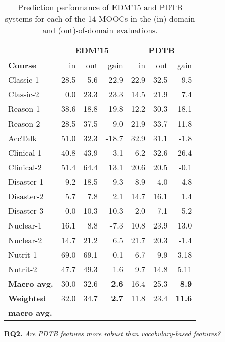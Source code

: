 \documentclass[letterpaper]{article}
\begin{document}
\begin{table}
\centering
\def\arraystretch{1.15}%
\small
\begin{tabular}{|l|r|r|r||r|r|r|}
\hline 
&
\multicolumn{3}{c||}{EDM'15} & 
\multicolumn{3}{c|}{PDTB}
\\
\hline
\bf Course&  in&  out & gain & in& out & gain\\
\hline
{\sc Classic-1} & 28.5& 5.6& -22.9& 22.9& 32.5& 9.5\\
\hline
{\sc Classic-2} & 0.0& 23.3& 23.3& 14.5& 21.9& 7.4\\
\hline
{\sc Reason-1} & 38.6& 18.8& -19.8& 12.2& 30.3& 18.1\\
\hline
{\sc Reason-2} & 28.5& 37.5& 9.0& 21.9& 33.7& 11.8\\
\hline
\hline
{\sc AccTalk} & 51.0& 32.3& -18.7& 32.9& 31.1& -1.8\\
\hline
{\sc Clinical-1} & 40.8& 43.9& 3.1& 6.2& 32.6& 26.4\\
\hline
{\sc Clinical-2} & 51.4& 64.4& 13.1& 20.6& 20.5& -0.1\\
\hline
{\sc Disaster-1} & 9.2& 18.5& 9.3& 8.9& 4.0& -4.8\\
\hline
{\sc Disaster-2} & 5.7& 7.8& 2.1&14.7 & 16.1& 1.4\\
\hline
{\sc Disaster-3} & 0.0& 10.3& 10.3&2.0 & 7.1& 5.2\\
\hline
{\sc Nuclear-1} & 16.1& 8.8& -7.3& 10.8& 23.9& 13.0\\
\hline
{\sc Nuclear-2} & 14.7& 21.2& 6.5& 21.7& 20.3& -1.4\\
\hline
{\sc Nutrit-1} & 69.0& 69.1& 0.1& 6.7& 9.9& 3.18\\
\hline
{\sc Nutrit-2} & 47.7& 49.3& 1.6& 9.7& 14.8& 5.11\\
\hline
\hline
\textbf{Macro avg.}& 30.0& 32.6& \textbf{2.6}& 16.4& 25.3& \textbf{8.9}\\
\hline
\textbf{Weighted} & 32.0& 34.7& \textbf{2.7}& 11.8& 23.4& \textbf{11.6}\\
\textbf{macro avg.}& & & & & &\\
\hline
\end{tabular}
\caption{Prediction performance of EDM'15 and PDTB 
systems for each of the 14 MOOCs in the (in)-domain 
and (out)-of-domain evaluations.}

\label{tab:pdtb-robust}
\end{table}

\noindent \textbf{RQ2.} {\it Are PDTB features more robust than 
vocabulary-based  features?}
\end{document}
